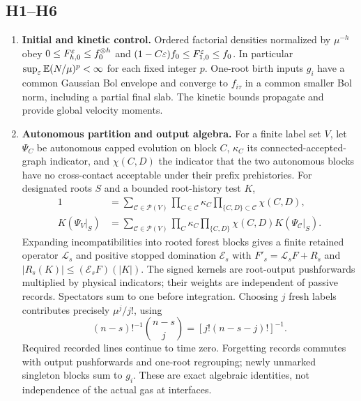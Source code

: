 \subsection{H1--H6}
\begin{enumerate}[label=H\arabic*.,ref=H\arabic*,leftmargin=2.8em]
\item\label{H:initial}\textbf{Initial and kinetic control.}
Ordered factorial densities normalized by $\mu^{-h}$ obey
$0\le F_{h,0}^\varepsilon\le f_0^{\otimes h}$ and
$(1-C\varepsilon)f_0\le F_{1,0}^\varepsilon\le f_0$.
In particular $\sup_\varepsilon\mathbb E(N/\mu)^p<\infty$ for each fixed integer $p$.
One-root birth inputs $g_i$ have a common Gaussian Bol envelope and converge
to $f_{i\tau}$ in a common smaller Bol norm, including a partial final slab.
The kinetic bounds propagate and provide global velocity moments.

\item\label{H:algebra}\textbf{Autonomous partition and output algebra.}
For a finite label set $V$, let $\Psi_C$ be autonomous capped evolution on
block $C$, $\kappa_C$ its connected-accepted-graph indicator, and
$\chi(C,D)$ the indicator that the two autonomous blocks have no cross-contact
acceptable under their prefix prehistories. For designated roots $S$ and
a bounded root-history test $K$,
\begin{align}
 1&=\sum_{\mathcal C\in\mathcal P(V)}\prod_{C\in\mathcal C}\kappa_C
                                \prod_{\{C,D\}\subset\mathcal C}\chi(C,D),
 \label{eq:partition}\\
 K(\Psi_V|_S)&=\sum_{\mathcal C\in\mathcal P(V)}\prod_C\kappa_C
          \prod_{\{C,D\}}\chi(C,D)K(\Psi_{\mathcal C}|_S).
 \label{eq:output}
\end{align}
Expanding incompatibilities into rooted forest blocks gives a finite retained
operator $\mathcal L_s$ and positive stopped domination $\mathcal E_s$ with
$F'_s=\mathcal L_sF+R_s$ and
$|R_s(K)|\le(\mathcal E_sF)(|K|)$.
The signed kernels are root-output pushforwards multiplied by physical
indicators; their weights are independent of passive records. Spectators
sum to one before integration. Choosing $j$ fresh labels contributes precisely
$\mu^j/j!$, using
\[
 (n-s)!^{-1}\binom{n-s}{j}=[j!(n-s-j)!]^{-1}.
\]
Required recorded lines continue to time zero. Forgetting records commutes
with output pushforwards and one-root regrouping; newly unmarked singleton
blocks sum to $g_i$. These are exact algebraic identities, not independence
of the actual gas at interfaces.


\end{enumerate}
